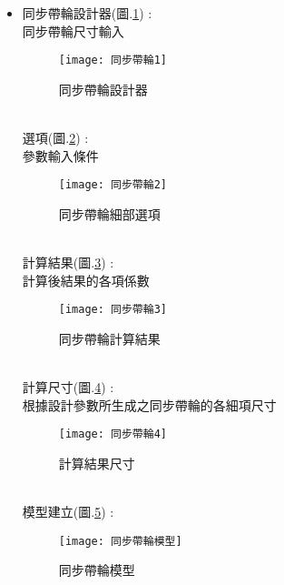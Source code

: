 \begin{itemize}
	\item 同步帶輪設計器(圖.\ref{2.61}) :\\
		\qquad 同步帶輪尺寸輸入\\
		\begin{figure}[hbt!]
		\begin{center}
		\texttt{[image: 同步帶輪1]}
		\caption{\Large 同步帶輪設計器}\label{2.61}
		\end{center}
		\end{figure}
		\\
		選項(圖.\ref{2.62}) :\\
		\qquad 參數輸入條件\\
		\begin{figure}[hbt!]
		\begin{center}
		\texttt{[image: 同步帶輪2]}
		\caption{\Large 同步帶輪細部選項}\label{2.62}
		\end{center}
		\end{figure}
		\\
		計算結果(圖.\ref{2.63}) :\\
		\qquad 計算後結果的各項係數\\
		\begin{figure}[hbt!]
		\begin{center}
		\texttt{[image: 同步帶輪3]}
		\caption{\Large 同步帶輪計算結果}\label{2.63}
		\end{center}
		\end{figure}
		\\
		計算尺寸(圖.\ref{2.64}) :\\
		\qquad 根據設計參數所生成之同步帶輪的各細項尺寸\\
		\begin{figure}[hbt!]
		\begin{center}
		\texttt{[image: 同步帶輪4]}
		\caption{\Large 計算結果尺寸}\label{2.64}
		\end{center}
		\end{figure}
		\\
		模型建立(圖.\ref{2.65}) :\\
		\begin{figure}[hbt!]
		\begin{center}
		\texttt{[image: 同步帶輪模型]}
		\caption{\Large 同步帶輪模型}\label{2.65}
		\end{center}
		\end{figure}
		\\
		
\newpage
		

\end{itemize}
